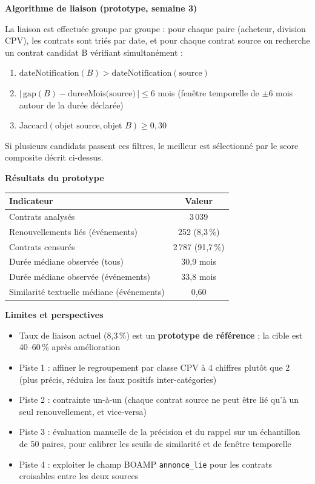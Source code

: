 \documentclass[12pt,a4paper]{article}
\begin{document}
\medskip
\textbf{Algorithme de liaison (prototype, semaine 3)}

La liaison est effectuée groupe par groupe : pour chaque paire
(acheteur, division CPV), les contrats sont triés par date, et pour chaque
contrat source on recherche un contrat candidat B vérifiant simultanément :

\begin{enumerate}
  \item $\text{dateNotification}(B) > \text{dateNotification}(\text{source})$
  \item $|\,\text{gap}(B) - \text{dureeMois(source)}\,| \leq 6$ mois
    (fenêtre temporelle de $\pm 6$ mois autour de la durée déclarée)
  \item $\text{Jaccard}(\text{objet source}, \text{objet } B) \geq 0{,}30$
\end{enumerate}

Si plusieurs candidats passent ces filtres, le meilleur est sélectionné par le
score composite décrit ci-dessus.

\medskip
\textbf{Résultats du prototype}

\begin{center}
\begin{tabular}{lc}
\toprule
\textbf{Indicateur} & \textbf{Valeur} \\
\midrule
Contrats analysés               & 3\,039 \\
Renouvellements liés (événements) & 252 (8,3\,\%) \\
Contrats censurés               & 2\,787 (91,7\,\%) \\
Durée médiane observée (tous)   & 30,9 mois \\
Durée médiane observée (événements) & 33,8 mois \\
Similarité textuelle médiane (événements) & 0,60 \\
\bottomrule
\end{tabular}
\end{center}

\medskip
\textbf{Limites et perspectives}

\begin{itemize}
  \item[---] Taux de liaison actuel (8,3\,\%) est un \textbf{prototype de
    référence} ; la cible est 40--60\,\% après amélioration
  \item[---] Piste 1 : affiner le regroupement par classe CPV à 4 chiffres
    plutôt que 2 (plus précis, réduira les faux positifs inter-catégories)
  \item[---] Piste 2 : contrainte un-à-un (chaque contrat source ne peut être
    lié qu'à un seul renouvellement, et vice-versa)
  \item[---] Piste 3 : évaluation manuelle de la précision et du rappel sur un
    échantillon de 50 paires, pour calibrer les seuils de similarité et de
    fenêtre temporelle
  \item[---] Piste 4 : exploiter le champ BOAMP \texttt{annonce\_lie} pour les
    contrats croisables entre les deux sources
\end{itemize}
\end{document}
